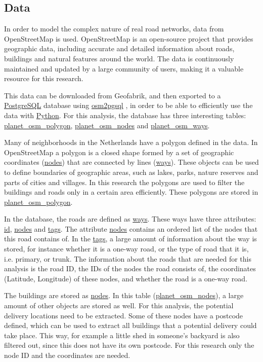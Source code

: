 \subsection{Data}
In order to model the complex nature of real road networks, data from OpenStreetMap \citep{openstreetmap} is used. 
OpenStreetMap is an open-source project that provides geographic data, including accurate and 
detailed information about roads, buildings and natural features around the world. The data is 
continuously maintained and updated by a large community of users, making it a valuable resource 
for this research.

This data can be downloaded from Geofabrik, and then exported to a \url{PostgreSQL} database using
\url{osm2pgsql} \citep{osm2pgsql}, in order to be able to efficiently use the data with \url{Python}. 
For this analysis, the database has three interesting tables: 
\url{planet_osm_polygon}, \url{planet_osm_nodes} and \url{planet_osm_ways}.

Many of neighborhoods in the Netherlands have a polygon 
defined in the data. In OpenStreetMap a polygon is a closed shape formed by a set of geographic coordinates 
(\url{nodes}) that are connected by lines (\url{ways}). These objects can be used to define boundaries of
geographic areas, such as lakes, parks, nature reserves and parts of cities and villages. In this
research the polygons are used to filter the buildings and roads only in a certain area efficiently.
These polygons are stored in \url{planet_osm_polygon}.

In the database, the roads are defined as \url{ways}. These ways have three
attributes: \url{id}, \url{nodes} and \url{tags}. The attribute \url{nodes} contains an ordered list
of the nodes that this road contains of.
In the \url{tags}, a large amount of 
information about the way is stored, for instance whether it is a 
one-way road, or the type of road that it is, i.e. primary, or trunk.
The information about the roads that are needed for this analysis is the
road ID, the IDs of the nodes the road consists of, the coordinates
(Latitude, Longitude) of these nodes, and whether the road is a one-way
road.

The buildings are stored as \url{nodes}. In this table (\url{planet_osm_nodes}),
a large amount of other objects are stored as well. For this analysis,
the potential delivery locations need to be extracted. Some of these 
nodes have a postcode defined, which can be used to extract all buildings
that a potential delivery could take place. This way, for example a little shed in 
someone's backyard is also filtered out, since this does not have its own 
postcode. For this research only the node ID and the coordinates are
needed.
